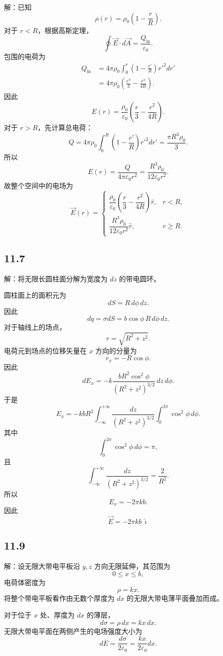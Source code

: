 \documentclass[UTF8,a4paper,12pt]{ctexart}
\begin{document}
解：已知
\[
\rho(r)=\rho_0\left(1-\frac{r}{R}\right).
\]
对于 $r<R$，根据高斯定理，
\[
\oint\vec{E}\cdot d\vec{A}
=
\frac{Q_{\text{in}}}{\varepsilon_0}.
\]
包围的电荷为
\[
\begin{aligned}
Q_{\text{in}}
&=
4\pi\rho_0
\int_0^r
\left(1-\frac{r'}{R}\right)r'^2dr'\\
&=
4\pi\rho_0
\left(
\frac{r^3}{3}-\frac{r^4}{4R}
\right).
\end{aligned}
\]
因此
\[
E(r)
=
\frac{\rho_0}{\varepsilon_0}
\left(
\frac{r}{3}-\frac{r^2}{4R}
\right).
\]
对于 $r>R$，先计算总电荷：
\[
Q
=
4\pi\rho_0
\int_0^R
\left(1-\frac{r'}{R}\right)r'^2dr'
=
\frac{\pi R^3\rho_0}{3}.
\]
所以
\[
E(r)
=
\frac{Q}{4\pi\varepsilon_0r^2}
=
\frac{R^3\rho_0}{12\varepsilon_0r^2}.
\]
故整个空间中的电场为
\[
\boxed{
\vec{E}(r)=
\begin{cases}
\dfrac{\rho_0}{\varepsilon_0}
\left(
\dfrac{r}{3}-\dfrac{r^2}{4R}
\right)\hat{r},
& r<R,\\[8pt]
\dfrac{R^3\rho_0}{12\varepsilon_0r^2}\hat{r},
& r\ge R.
\end{cases}
}
\]

\subsection*{11.7}

解：将无限长圆柱面分解为宽度为 $dz$ 的带电圆环。

圆柱面上的面积元为
\[
dS=R\,d\phi\,dz.
\]
因此
\[
dq
=
\sigma dS
=
b\cos\phi\,R\,d\phi\,dz.
\]
对于轴线上的场点，
\[
r=\sqrt{R^2+z^2}.
\]
电荷元到场点的位移矢量在 $x$ 方向的分量为
\[
r_x=-R\cos\phi.
\]
因此
\[
dE_x
=
-k
\frac{bR^2\cos^2\phi}
{(R^2+z^2)^{3/2}}
\,dz\,d\phi.
\]
于是
\[
E_x
=
-kbR^2
\int_{-\infty}^{+\infty}
\frac{dz}{(R^2+z^2)^{3/2}}
\int_0^{2\pi}\cos^2\phi\,d\phi.
\]
其中
\[
\int_0^{2\pi}\cos^2\phi\,d\phi=\pi,
\]
且
\[
\int_{-\infty}^{+\infty}
\frac{dz}{(R^2+z^2)^{3/2}}
=
\frac{2}{R^2}.
\]
所以
\[
E_x=-2\pi kb.
\]
因此
\[
\boxed{
\vec{E}=-2\pi kb\,\hat{\imath}
}
\]

\subsection*{11.9}

解：设无限大带电平板沿 $y,z$ 方向无限延伸，其范围为
\[
0\le x\le b,
\]
电荷体密度为
\[
\rho=kx.
\]
将整个带电平板看作由无数个厚度为 $dx$ 的无限大带电薄平面叠加而成。

对于位于 $x$ 处、厚度为 $dx$ 的薄层，
\[
d\sigma=\rho\,dx=kx\,dx.
\]
无限大带电平面在两侧产生的电场强度大小为
\[
dE=\frac{d\sigma}{2\varepsilon_0}
=
\frac{kx}{2\varepsilon_0}dx.
\]
\end{document}

